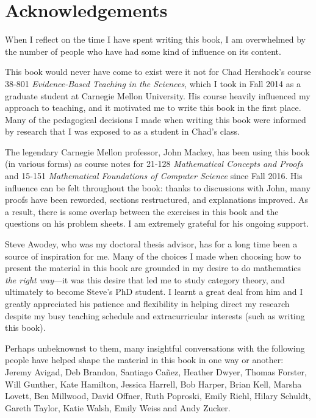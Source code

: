 \chapter*{Acknowledgements}

When I reflect on the time I have spent writing this book, I am overwhelmed by the number of people who have had some kind of influence on its content.

This book would never have come to exist were it not for Chad Hershock's course 38-801 \textit{Evidence-Based Teaching in the Sciences}, which I took in Fall 2014 as a graduate student at Carnegie Mellon University. His course heavily influenced my approach to teaching, and it motivated me to write this book in the first place. Many of the pedagogical decisions I made when writing this book were informed by research that I was exposed to as a student in Chad's class.

The legendary Carnegie Mellon professor, John Mackey, has been using this book (in various forms) as course notes for 21-128 \textit{Mathematical Concepts and Proofs} and 15-151 \textit{Mathematical Foundations of Computer Science} since Fall 2016. His influence can be felt throughout the book: thanks to discussions with John, many proofs have been reworded, sections restructured, and explanations improved. As a result, there is some overlap between the exercises in this book and the questions on his problem sheets. I am extremely grateful for his ongoing support.

Steve Awodey, who was my doctoral thesis advisor, has for a long time been a source of inspiration for me. Many of the choices I made when choosing how to present the material in this book are grounded in my desire to do mathematics \textit{the right way}---it was this desire that led me to study category theory, and ultimately to become Steve's PhD student. I learnt a great deal from him and I greatly appreciated his patience and flexibility in helping direct my research despite my busy teaching schedule and extracurricular interests (such as writing this book).

Perhaps unbeknownst to them, many insightful conversations with the following people have helped shape the material in this book in one way or another: Jeremy Avigad, Deb Brandon, Santiago Ca\~{n}ez, Heather Dwyer, Thomas Forster, Will Gunther, Kate Hamilton, Jessica Harrell, Bob Harper, Brian Kell, Marsha Lovett, Ben Millwood, David Offner, Ruth Poproski, Emily Riehl, Hilary Schuldt, Gareth Taylor, Katie Walsh, Emily Weiss and Andy Zucker.

